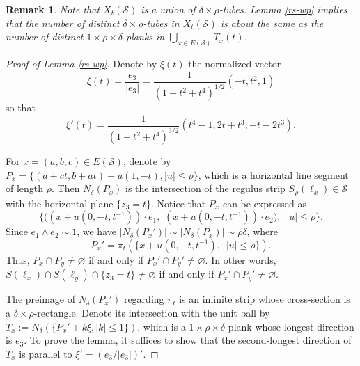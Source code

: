 \documentclass{amsart}%
\numberwithin{equation}{section}
\newtheorem{remark}[theorem]{Remark}
\newcommand{\de}{\delta}
\newcommand{\cs}{\mathcal S}
\newcommand{\1}{\mathbbm{1}}
\begin{document}
\begin{remark}

\rm

Note that $X_t(\cs)$ is a union of $\de\times\rho$-tubes. 
Lemma \ref{rs-wp} implies that the number of distinct $\de\times\rho$-tubes in $X_t(\cs)$ is about the same as the number of distinct $1\times\rho\times\de$-planks in $\bigcup_{x\in E(\cs)} T_x(t)$.
\end{remark}

\begin{proof}[Proof of Lemma \ref{rs-wp}]

Denote by $\xi(t)$ the normalized vector
\begin{equation}
    \xi(t)=\frac{e_3}{|e_3|}=\frac{1}{(1+t^2+t^4)^{1/2}}(-t,t^2,1)
\end{equation}
so that
\begin{equation}
\label{ga-prime}
    \xi'(t)=\frac{1}{(1+t^2+t^4)^{3/2}}(t^4-1,2t+t^3,-t-2t^3).
\end{equation}

For $x=(a,b,c)\in E(\cs)$, denote by $P_x=\{(a+ct, b+at)+u(1,-t), |u|\leq\rho\}$, which is a horizontal line segment of length $\rho$. 
Then $N_\de(P_x)$ is the intersection of the regulus strip $S_\rho(\ell_x)\in\cs$ with the horizontal plane $\{z_3=t\}$. 
Notice that $P_x$ can be expressed as
\begin{equation}
    \{\big((x+u(0,-t,t^{-1}))\cdot e_1,\,\, (x+u(0,-t,t^{-1}))\cdot e_2\big), \,\,\,|u|\leq\rho\}.
\end{equation}
Since $e_1\wedge e_2\sim 1$, we have $|N_\de(P_x')|\sim |N_\de(P_x)|\sim\rho\de$, where
\begin{equation}
\label{l-x-prime}
    P_x'=\pi_t(\{x+u(0,-t,t^{-1}),\,\,\, |u|\leq\rho\}).
\end{equation}
Thus, $P_x\cap P_y\not=\varnothing$ if and only if $P_x'\cap P_y'\not=\varnothing$. 
In other words, $S(\ell_x)\cap S(\ell_y)\cap \{z_3=t\}\not=\varnothing$ if and only if $P_x'\cap P_y'\not=\varnothing$.

\smallskip

The preimage of $N_\de(P_x')$ regarding $\pi_t$ is an infinite strip whose cross-section is a $\de\times\rho$-rectangle.
Denote its intersection with the unit ball by $T_x:=N_\de(\{P_x'+k\xi, |k|\leq 1\})$, which is a $1\times\rho\times\de$-plank whose longest direction is $e_3$. 
To prove the lemma, it suffices to show that the second-longest direction of $T_x$ is parallel to $\xi'=(e_3/|e_3|)'$. 


\end{proof}
\end{document}

